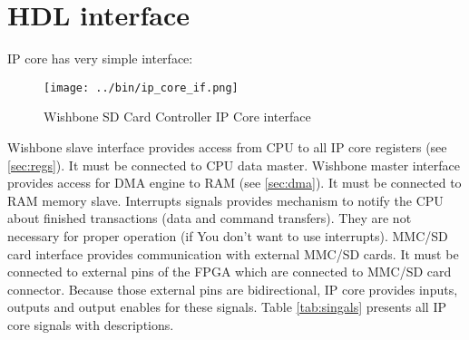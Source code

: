 \section{HDL interface}
\label{sec:hdl_if}

    IP core has very simple interface:
    \begin{figure}[H]
        \centering
        \texttt{[image: ../bin/ip\_core\_if.png]}
        \caption{Wishbone SD Card Controller IP Core interface}
        \label{img:ip_core_if}
    \end{figure}
    Wishbone slave interface provides access from CPU to all IP core registers (see \ref{sec:regs}). It must
    be connected to CPU data master. Wishbone master interface provides access for DMA engine to RAM (see \ref{sec:dma}). 
    It must be connected to RAM memory slave. Interrupts signals provides mechanism to notify the CPU about finished transactions (data and command transfers).
    They are not necessary for proper operation (if You don't want to use interrupts). MMC/SD card interface provides communication with external MMC/SD cards.
    It must be connected to external pins of the FPGA which are connected to MMC/SD card connector. Because those external pins are bidirectional, IP core
    provides inputs, outputs and output enables for these signals.
    Table \ref{tab:singals} presents all IP core signals with descriptions.
    
